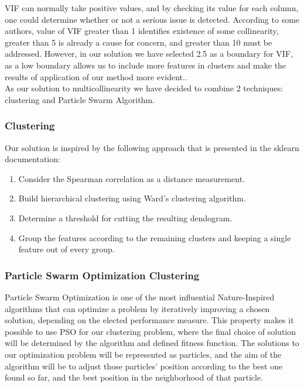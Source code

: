 \documentclass[conference]{IEEEtran}
\begin{document}
VIF can normally take positive values, and by checking its value for each column, one could determine whether or not a serious issue is detected. According to some authors, value of VIF greater than 1 identifies existence of some collinearity, greater than 5 is already a cause for concern, and greater than 10 must be addressed. However, in our solution we have selected 2.5 as a boundary for VIF, as a low boundary allows us to include more features in clusters and make the results of application of our method more evident.\cite{menard2002applied}.\\

As our solution to multicollinearity we have decided to combine 2 techniques: clustering and Particle Swarm Algorithm.\\

\subsubsection{Clustering}

Our solution is inspired by the following approach that is presented in the sklearn documentation\cite{sklearn_permutation}:
\begin{enumerate}
	\item Consider the Spearman correlation as a distance measurement.
	\item Build hierarchical clustering using Ward's clustering algorithm.
	\item Determine a threshold for cutting the resulting dendogram.
	\item Group the features according to the remaining clusters and keeping a single feature out of every group.	
\end{enumerate}

\subsubsection{Particle Swarm Optimization Clustering}

Particle Swarm Optimization is one of the most influential Nature-Inspired algorithms that can optimize a problem by iteratively improving a chosen solution, depending on the elected performance measure\cite{ballardini2018tutorial}. This property makes it possible to use PSO for our clustering problem, where the final choice of solution will be determined by the algorithm and defined fitness function. The solutions to our optimization problem will be represented as particles, and the aim of the algorithm will be to adjust those particles' position according to the best one found so far, and the best position in the neighborhood of that particle.\\
\end{document}
